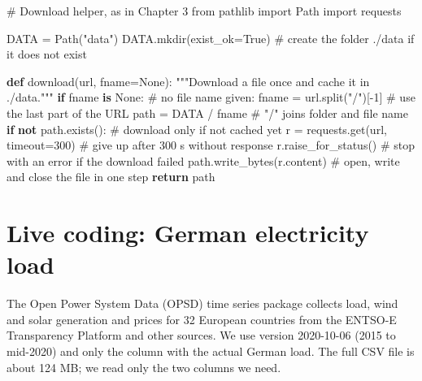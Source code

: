 \documentclass[
  letterpaper,
  DIV=11,
  numbers=noendperiod]{scrreprt}
\newenvironment{Shaded}{\begin{snugshade}}{\end{snugshade}}
\newcommand{\CommentTok}[1]{\textcolor[rgb]{0.37,0.37,0.37}{#1}}
\newcommand{\ControlFlowTok}[1]{\textcolor[rgb]{0.00,0.23,0.31}{\textbf{#1}}}
\newcommand{\DecValTok}[1]{\textcolor[rgb]{0.68,0.00,0.00}{#1}}
\newcommand{\ImportTok}[1]{\textcolor[rgb]{0.00,0.46,0.62}{#1}}
\newcommand{\KeywordTok}[1]{\textcolor[rgb]{0.00,0.23,0.31}{\textbf{#1}}}
\newcommand{\NormalTok}[1]{\textcolor[rgb]{0.00,0.23,0.31}{#1}}
\newcommand{\OperatorTok}[1]{\textcolor[rgb]{0.37,0.37,0.37}{#1}}
\newcommand{\StringTok}[1]{\textcolor[rgb]{0.13,0.47,0.30}{#1}}
\newcommand{\VariableTok}[1]{\textcolor[rgb]{0.07,0.07,0.07}{#1}}
\begin{document}
\begin{Shaded}
\begin{Highlighting}[]
\CommentTok{\# Download helper, as in Chapter 3}
\ImportTok{from}\NormalTok{ pathlib }\ImportTok{import}\NormalTok{ Path}
\ImportTok{import}\NormalTok{ requests}

\NormalTok{DATA }\OperatorTok{=}\NormalTok{ Path(}\StringTok{"data"}\NormalTok{)}
\NormalTok{DATA.mkdir(exist\_ok}\OperatorTok{=}\VariableTok{True}\NormalTok{)                         }\CommentTok{\# create the folder ./data if it does not exist}

\KeywordTok{def}\NormalTok{ download(url, fname}\OperatorTok{=}\VariableTok{None}\NormalTok{):}
    \CommentTok{"""Download a file once and cache it in ./data."""}
    \ControlFlowTok{if}\NormalTok{ fname }\KeywordTok{is} \VariableTok{None}\NormalTok{:                             }\CommentTok{\# no file name given:}
\NormalTok{        fname }\OperatorTok{=}\NormalTok{ url.split(}\StringTok{"/"}\NormalTok{)[}\OperatorTok{{-}}\DecValTok{1}\NormalTok{]                }\CommentTok{\# use the last part of the URL}
\NormalTok{    path }\OperatorTok{=}\NormalTok{ DATA }\OperatorTok{/}\NormalTok{ fname                           }\CommentTok{\# "/" joins folder and file name}
    \ControlFlowTok{if} \KeywordTok{not}\NormalTok{ path.exists():                         }\CommentTok{\# download only if not cached yet}
\NormalTok{        r }\OperatorTok{=}\NormalTok{ requests.get(url, timeout}\OperatorTok{=}\DecValTok{300}\NormalTok{)        }\CommentTok{\# give up after 300 s without response}
\NormalTok{        r.raise\_for\_status()                      }\CommentTok{\# stop with an error if the download failed}
\NormalTok{        path.write\_bytes(r.content)               }\CommentTok{\# open, write and close the file in one step}
    \ControlFlowTok{return}\NormalTok{ path}
\end{Highlighting}
\end{Shaded}

\section{Live coding: German electricity
load}\label{live-coding-german-electricity-load}

The Open Power System Data (OPSD) time series package collects load,
wind and solar generation and prices for 32 European countries from the
ENTSO-E Transparency Platform and other sources. We use version
2020-10-06 (2015 to mid-2020) and only the column with the actual German
load. The full CSV file is about 124 MB; we read only the two columns we
need.
\end{document}
